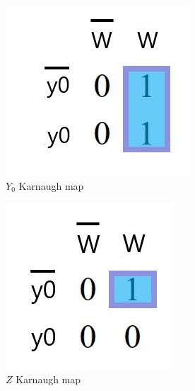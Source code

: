 \documentclass[../../e3_tp3_main.tex]{subfiles}
\begin{document}
\begin{figure}[H]
	\centering
	\includegraphics[scale=1]{figures/e3_tp3_ej3_mealy_y0_kmap.jpg}
	\caption{$Y_0$ Karnaugh map}
\end{figure}

\begin{figure}[H]
	\centering
	\includegraphics[scale=1]{figures/e3_tp3_ej3_mealy_z_kmap.jpg}
	\caption{$Z$ Karnaugh map}
\end{figure}
\end{document}
